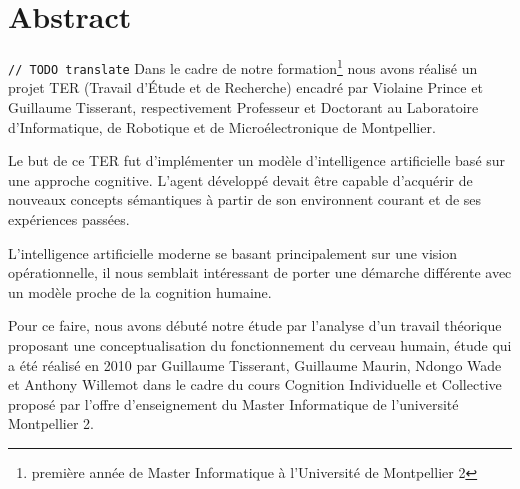 \chapter*{Abstract}
\verb+// TODO translate+
Dans le cadre de notre formation\footnote{première année de Master Informatique à l'Université de Montpellier 2} nous avons réalisé un projet TER (Travail d'Étude et de Recherche) encadré par \mbox{Violaine} \mbox{Prince} et \mbox{Guillaume} \mbox{Tisserant}, respectivement Professeur et Doctorant au Laboratoire d'Informatique, de Robotique et de Microélectronique de Montpellier.

Le but de ce TER fut d'implémenter un modèle d'intelligence artificielle basé sur une approche cognitive. L'agent développé devait être capable d'acquérir de nouveaux concepts sémantiques à partir de son environnent courant et de ses expériences passées.

L'intelligence artificielle moderne se basant principalement sur une vision opérationnelle, il nous semblait intéressant de porter une démarche différente avec un modèle proche de la cognition humaine.

Pour ce faire, nous avons débuté notre étude par l'analyse d'un travail théorique proposant une conceptualisation du fonctionnement du cerveau humain, étude qui a été réalisé en 2010 par \mbox{Guillaume} \mbox{Tisserant}, \mbox{Guillaume} \mbox{Maurin}, \mbox{Ndongo} \mbox{Wade} et \mbox{Anthony} \mbox{Willemot} dans le cadre du cours \og Cognition Individuelle et Collective\fg{} proposé par l'offre d'enseignement du Master Informatique de l'université Montpellier 2.
